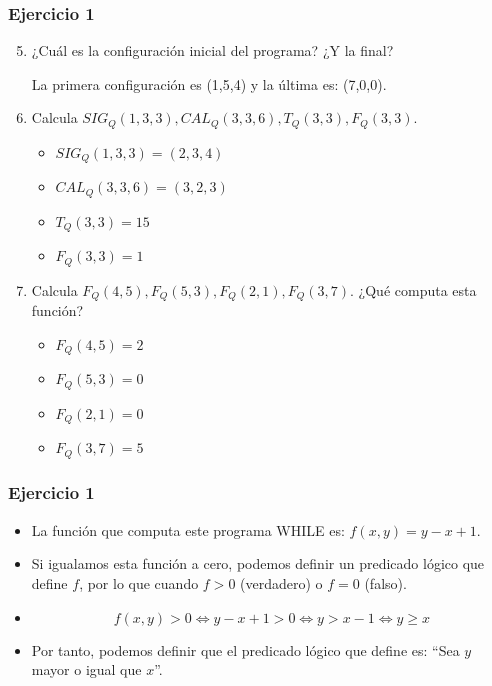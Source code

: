 \documentclass[xcolor=table]{beamer}
\begin{document}
\begin{frame} \frametitle{Ejercicio 1} \footnotesize  

\begin{enumerate}
\setcounter{enumi}{4}

\item ¿Cuál es la configuración inicial del programa? ¿Y la final?

La primera configuración es (1,5,4) y la última es: (7,0,0).

\item Calcula $SIG_Q (1,3,3), CAL_Q (3,3,6), T_Q (3,3), F_Q (3,3)$.

\begin{itemize}
        \item $SIG_Q (1,3,3) = (2,3,4)$
        \item $CAL_Q (3,3,6) = (3,2,3)$
        \item $T_Q (3,3) = 15$
        \item $F_Q (3,3) = 1$
    \end{itemize}
    
\item Calcula $F_Q (4,5), F_Q (5,3), F_Q (2,1), F_Q (3,7)$. ¿Qué computa esta función?

\begin{itemize}
        \item $F_Q (4,5) = 2$
        \item $F_Q (5,3) = 0$
        \item $F_Q (2,1) = 0$
        \item $F_Q (3,7) = 5$
    \end{itemize}
\end{enumerate}
\end{frame} 

\begin{frame}  \frametitle{Ejercicio 1}

\begin{itemize}
    \item La función que computa este programa WHILE es: $f(x,y)=y-x+1$.
     
    \item Si igualamos esta función a cero, podemos definir un predicado lógico que define $f$, por lo que cuando $f>0$ (verdadero) o $f=0$ (falso).
 
    \item $$f(x,y)>0 \iff y-x+1 >0 \iff y >x-1 \iff y \geq x$$ 
    \item Por tanto, podemos definir que el predicado lógico que define es: ``Sea $y$ mayor o igual que $x$''.
\end{itemize}
\end{frame} 
\end{document}
